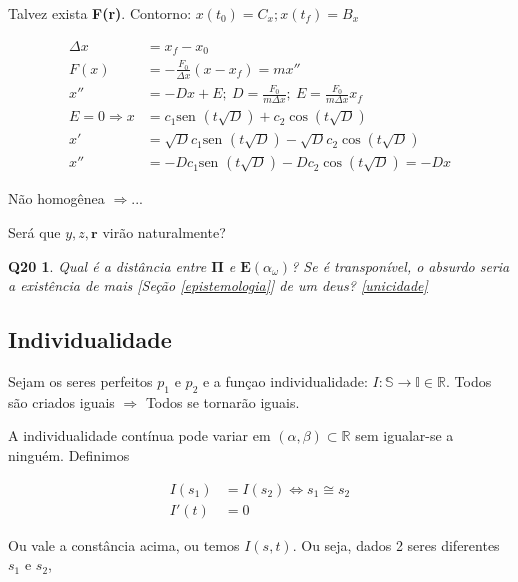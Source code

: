 \documentclass[12pt,a4paper]{article}
\begin{document}
			Talvez exista \textbf{F(r)}. Contorno: $ x(t_0) = C_x; x(t_f) = B_x $

			\begin{align*}
				\Delta x &= x_f - x_0 \\
				F(x) &= - \frac{F_0}{\Delta x} (x - x_f) = m x'' \\
				x'' &= -Dx + E; \ D = \frac{F_0}{m \Delta x}; \ E = \frac{F_0}{m \Delta x} x_f \\
				E = 0 \Rightarrow x &= c_1 \mbox{sen }(t \sqrt{D}) + c_2 \cos (t \sqrt{D}) \\
				x' &= \sqrt{D} c_1 \mbox{sen }(t \sqrt{D}) - \sqrt{D} c_2 \cos (t \sqrt{D}) \\
				x'' &= -D c_1 \mbox{sen }(t \sqrt{D}) - D c_2 \cos(t \sqrt{D}) = -Dx
			\end{align*}

			N\~ao homog\^enea $\Rightarrow$...

			Ser\'a que $y,z, \mathbf{r}$ vir\~ao naturalmente?

			\newtheorem{Q20}{Q20}
			\begin{Q20} Qual \'e a dist\^ancia entre $ \mathbf{\Pi} $ e $ \mathbf{E}(\alpha_\omega )$? Se \'e transpon\'ivel, o absurdo seria a exist\^encia de mais [Se\c{c}\~ao \ref{epistemologia}] de um deus? \ref{unicidade}
			\end{Q20}

		\subsection{Individualidade}\label{individuality}
			\begin{flushright}
			\end{flushright}

			Sejam os seres perfeitos $ p_1 $ e $ p_2 $ e a fun\c{c}ao individualidade: $ I: \mathbb{S} \rightarrow \mathbb{I} \in \mathbb{R}$. Todos s\~ao criados iguais $ \Rightarrow $ Todos se tornar\~ao iguais.

			A individualidade cont\'inua pode variar em $(\alpha, \beta) \subset \mathbb{R}$ sem igualar-se a ningu\'em. Definimos

			\begin{align*}
				I(s_1) &= I(s_2) \Leftrightarrow s_1 \cong s_2 \\
				I'(t) &= 0
			\end{align*}

			Ou vale a const\^ancia acima, ou temos $I(s, t)$. Ou seja, dados 2 seres diferentes $s_1$ e $s_2$,
\end{document}
